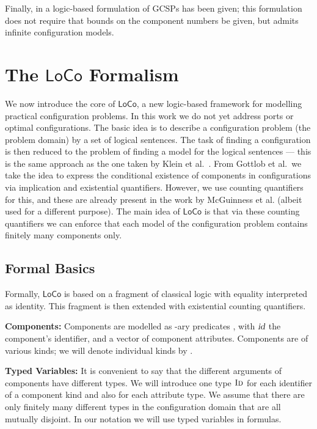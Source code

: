 \documentclass[copyright,creativecommons]{eptcs}
\newcommand{\cid}{\ensuremath{\textsl{id}}\xspace}
\newcommand{\LoCo}{\ensuremath{\mathsf{LoCo}}\xspace}
\newcommand{\sort}[1]{\ensuremath{\text{\sc #1}}\xspace}
\begin{document}
Finally, in \cite{FriedrichStumptnerConfWS99} a logic-based formulation of GCSPs has been given; 
this formulation does not require that bounds on the component numbers be given, but admits infinite configuration models.

\section{The \LoCo Formalism}

We now introduce the core of \LoCo, a new logic-based framework for modelling practical configuration problems. 
In this work we do not yet address ports or optimal configurations.
The basic idea is to describe a configuration problem (the problem domain) by a set of logical sentences.
The task of finding a configuration is then reduced to the problem of finding a model for the logical sentences ---
this is the same approach as the one taken by Klein et al.\ \cite{DFKI-TM-95-01}.
From Gottlob et al.\ we take the idea to express the conditional existence of components in configurations via implication and existential quantifiers.
However, we use counting quantifiers for this, and these are already present in the work by McGuinness et al. (albeit used for a different purpose).
The main idea of \LoCo is that via these counting quantifiers we can enforce that each model of the configuration problem contains finitely many components only.

\subsection{Formal Basics}

Formally, \LoCo is based on a fragment of classical logic with equality interpreted as identity. 
This fragment is then extended with existential counting quantifiers.

{\noindent \bf Components\/:} Components are modelled as -ary predicates , with \cid the component's identifier, and  a vector of component attributes.
Components are of various kinds; we will denote individual kinds by .

{\noindent \bf Typed Variables\/:} 
It is convenient to say that the different arguments of components have different types.
We will introduce one type \sort{Id} for each identifier of a component kind and also for each attribute type.
We assume that there are only finitely many different types in the configuration domain that are all mutually disjoint.
In our notation we will use typed variables in formulas.
\end{document}

